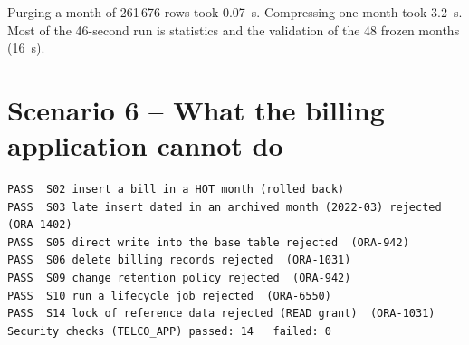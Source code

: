 Purging a month of 261\,676 rows took 0.07~s. Compressing one month took 3.2~s. Most of the
46-second run is statistics and the validation of the 48 frozen months (16~s).

\section{Scenario 6 -- What the billing application cannot do}

\needspace{0.3\textheight}
\begin{lstlisting}[style=console, caption={Asserted security checks as \code{TELCO\_APP} (excerpt)}]
PASS  S02 insert a bill in a HOT month (rolled back)
PASS  S03 late insert dated in an archived month (2022-03) rejected  (ORA-1402)
PASS  S05 direct write into the base table rejected  (ORA-942)
PASS  S06 delete billing records rejected  (ORA-1031)
PASS  S09 change retention policy rejected  (ORA-942)
PASS  S10 run a lifecycle job rejected  (ORA-6550)
PASS  S14 lock of reference data rejected (READ grant)  (ORA-1031)
Security checks (TELCO_APP) passed: 14   failed: 0
\end{lstlisting}
